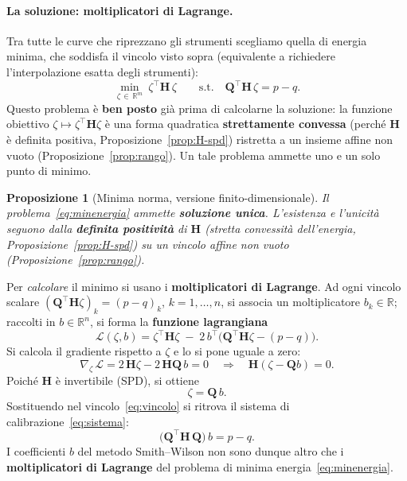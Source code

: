 \documentclass[11pt,a4paper]{article}
\theoremstyle{plain}
\newtheorem{proposizione}[teorema]{Proposizione}
\theoremstyle{definition}
\theoremstyle{remark}
\newcommand{\Qmat}{\mathbf{Q}}
\newcommand{\Hmat}{\mathbf{H}}
\newcommand{\transp}{^{\!\top}}
\begin{document}
\paragraph{La soluzione: moltiplicatori di Lagrange.}
Tra tutte le curve che riprezzano gli strumenti scegliamo quella di energia minima, che soddisfa
il vincolo visto sopra (equivalente a richiedere l'interpolazione esatta degli strumenti):
\begin{equation}
  \min_{\zeta\,\in\,\mathbb{R}^m} \ \zeta\transp \Hmat\, \zeta
  \qquad \text{s.t.}\quad
  \Qmat\transp \Hmat\, \zeta = p - q .
  \label{eq:minenergia}
\end{equation}
Questo problema \`e \textbf{ben posto} gi\`a prima di calcolarne la soluzione: la funzione
obiettivo $\zeta\mapsto\zeta\transp\Hmat\zeta$ \`e una forma quadratica
\textbf{strettamente convessa} (perch\'e $\Hmat$ \`e definita positiva,
Proposizione~\ref{prop:H-spd}) ristretta a un insieme affine non vuoto
(Proposizione~\ref{prop:rango}). Un tale problema ammette uno e un solo punto di minimo.

\begin{proposizione}[Minima norma, versione finito-dimensionale]
\label{prop:minnorm-finita}
Il problema~\eqref{eq:minenergia} ammette \textbf{soluzione unica}. L'esistenza e
l'unicit\`a seguono dalla \textbf{definita positivit\`a} di $\Hmat$ (stretta
convessit\`a dell'energia, Proposizione~\ref{prop:H-spd}) su un vincolo affine non vuoto
(Proposizione~\ref{prop:rango}).
\end{proposizione}

Per \emph{calcolare} il minimo si usano i \textbf{moltiplicatori di Lagrange}.
Ad ogni vincolo scalare $(\Qmat\transp\Hmat\zeta)_k = (p-q)_k$, $k=1,\ldots,n$,
si associa un moltiplicatore $b_k\in\mathbb{R}$; raccolti in $b\in\mathbb{R}^n$, si forma la
\textbf{funzione lagrangiana}
\begin{equation}
  \mathcal{L}(\zeta,b)
  = \zeta\transp\Hmat\zeta
    \;-\; 2\,b\transp\!\bigl(\Qmat\transp\Hmat\zeta - (p-q)\bigr).
  \label{eq:lagrangiana}
\end{equation}
Si calcola il gradiente rispetto a $\zeta$ e lo si pone uguale a zero:
\[
  \nabla_\zeta\,\mathcal{L}
  = 2\,\Hmat\zeta - 2\,\Hmat\Qmat\,b = 0
  \quad\Longrightarrow\quad
  \Hmat(\zeta - \Qmat b) = 0.
\]
Poich\'e $\Hmat$ \`e invertibile (SPD), si ottiene
\[
  \zeta = \Qmat\, b .
\]
Sostituendo nel vincolo~\eqref{eq:vincolo} si ritrova il sistema di
calibrazione~\eqref{eq:sistema}:
\[
  \bigl(\Qmat\transp \Hmat\, \Qmat\bigr)\, b = p - q .
\]
I coefficienti $b$ del metodo Smith--Wilson non sono dunque altro che i
\textbf{moltiplicatori di Lagrange} del problema di minima energia~\eqref{eq:minenergia}.
\end{document}
